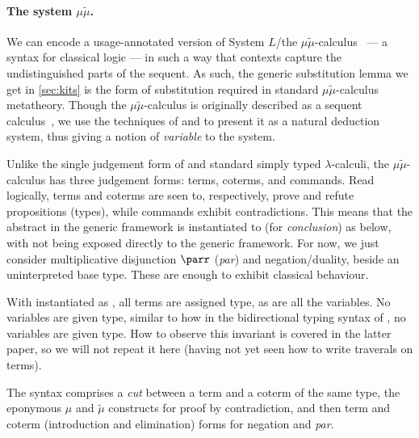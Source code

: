 \paragraph{The system $\mu\tilde\mu$.}
We can encode a usage-annotated version of System $L$/the
$\mu\tilde\mu$-calculus~\cite{CH00} --- a syntax for classical logic --- in
such a way that contexts capture the undistinguished parts of the sequent.
As such, the generic substitution lemma we get in \cref{sec:kits} is the form
of substitution required in standard $\mu\tilde\mu$-calculus metatheory.
Though the $\mu\tilde\mu$-calculus is originally described as a sequent
calculus~\cite{CH00}, we use the techniques of
\citet[p.~12]{herbelin-hab} and \citet{LC06} to present it as a natural
deduction system, thus giving a notion of \emph{variable} to the system.

Unlike the single judgement form of \name{} and standard simply typed
$\lambda$-calculi, the $\mu\tilde\mu$-calculus has three judgement forms:
terms, coterms, and commands.
Read logically, terms and coterms are seen to, respectively, prove and refute
propositions (types), while commands exhibit contradictions.
This means that the abstract  in the generic framework is
instantiated to  (for \emph{conclusion}) as below, with
 not being exposed directly to the generic framework.
For now, we just consider multiplicative disjunction $\parr$ (\emph{par}) and
negation/duality, beside an uninterpreted base type.
These are enough to exhibit classical behaviour.

\noindent
\begin{minipage}[t]{0.5\textwidth}
\end{minipage}
\begin{minipage}[t]{0.5\textwidth}
\end{minipage}

With  instantiated as , all terms are assigned
 type, as are all the variables.
No variables are given  type, similar to how in
the bidirectional typing syntax of \citet[p.~25]{AACMM20}, no variables are
given  type.
How to observe this invariant is covered in the latter paper, so we will not
repeat it here (having not yet seen how to write traverals on terms).

The syntax comprises a \emph{cut} between a term and a coterm of the same type,
the eponymous $\mu$ and $\tilde\mu$ constructs for proof by contradiction, and
then term and coterm (introduction and elimination) forms for negation and
\emph{par}.


